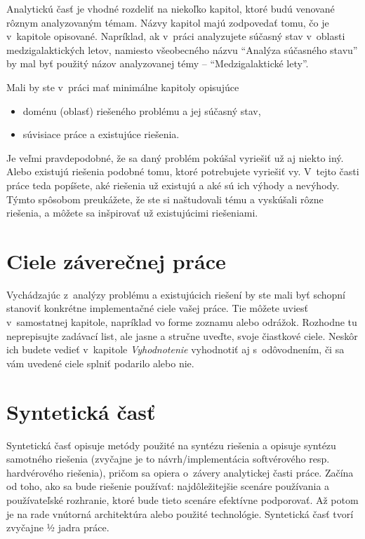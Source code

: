 Analytickú časť je vhodné rozdeliť na niekoľko kapitol, ktoré budú venované rôznym analyzovaným témam. Názvy kapitol majú zodpovedať tomu, čo je v~kapitole opisované. Napríklad, ak v~práci analyzujete súčasný stav v~oblasti medzigalaktických letov, namiesto všeobecného názvu \enquote{Analýza súčasného stavu} by mal byť použitý názov analyzovanej témy -- \enquote{Medzigalaktické lety}.

Mali by ste v~práci mať minimálne kapitoly opisujúce
\begin{itemize}
  \item doménu (oblasť) riešeného problému a jej súčasný stav,
  \item súvisiace práce a existujúce riešenia.
\end{itemize}

Je veľmi pravdepodobné, že sa daný problém pokúšal vyriešiť už aj niekto iný. Alebo existujú riešenia podobné tomu, ktoré potrebujete vyriešiť vy. V~tejto časti práce teda popíšete, aké riešenia už existujú a aké sú ich výhody a nevýhody. Týmto spôsobom preukážete, že ste si naštudovali tému a vyskúšali rôzne riešenia, a môžete sa inšpirovať už existujúcimi riešeniami.


\section*{Ciele záverečnej práce}

Vychádzajúc z~analýzy problému a existujúcich riešení by ste mali byť schopní stanoviť konkrétne implementačné ciele vašej práce. Tie môžete uviesť v~samostatnej kapitole, napríklad vo forme zoznamu alebo odrážok. Rozhodne tu neprepisujte zadávací list, ale jasne a stručne uveďte, svoje čiastkové ciele. Neskôr ich budete vedieť v~kapitole \emph{Vyhodnotenie} vyhodnotiť aj s~odôvodnením, či sa vám uvedené ciele splniť podarilo alebo nie.

\section*{Syntetická časť}

Syntetická časť opisuje metódy použité na syntézu riešenia a opisuje syntézu samotného riešenia (zvyčajne je to návrh/implementácia softvérového resp. hardvérového riešenia), pričom sa opiera o~závery analytickej časti práce. Začína od toho, ako sa bude riešenie používať: najdôležitejšie scenáre používania a používateľské rozhranie, ktoré bude tieto scenáre efektívne podporovať. Až potom je na rade vnútorná architektúra alebo použité technológie. Syntetická časť tvorí zvyčajne ½ jadra práce.


